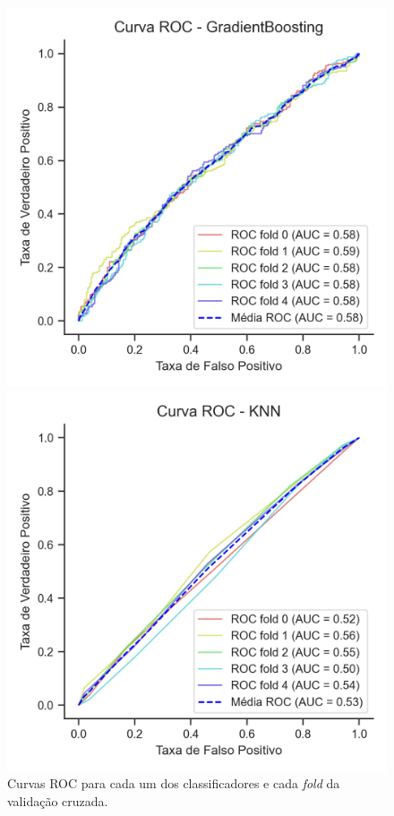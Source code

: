 \begin{figure}
	\centering
	\caption{\label{img:curvasRocSemTunagem}Curvas ROC para cada um dos classificadores e cada \textit{fold} da validação cruzada.}
	
	\begin{minipage}[t]{0.28\textwidth}
		\centering
		\includegraphics[width=\textwidth]{USPSC-img/Curva ROC - GradientBoosting.png}
	\end{minipage}
	\hfill
	\begin{minipage}[t]{0.28\textwidth}
		\centering
		\includegraphics[width=\textwidth]{USPSC-img/Curva ROC - KNN.png}

\end{minipage}
\end{figure}
